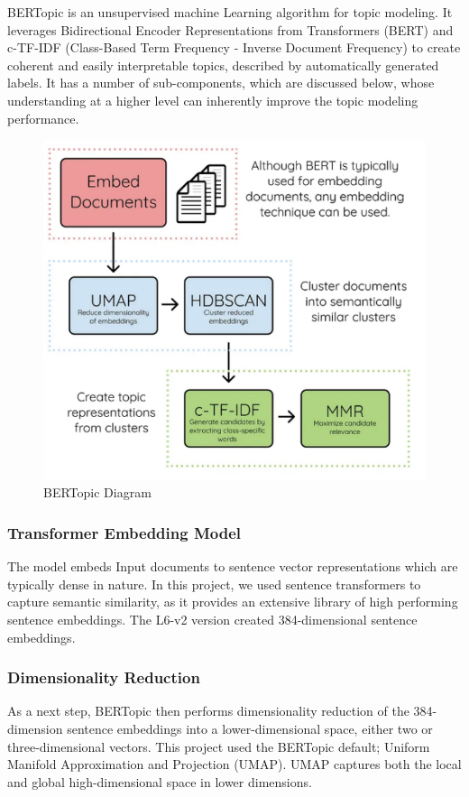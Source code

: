 \documentclass{article}
\theoremstyle{mytheoremstyle}
\theoremstyle{mytheoremstyle}
\theoremstyle{myproblemstyle}
\begin{document}
    BERTopic is an unsupervised machine Learning  algorithm for topic modeling. It leverages Bidirectional Encoder Representations from Transformers (BERT) and c-TF-IDF (Class-Based Term Frequency - Inverse Document Frequency) to create coherent and easily interpretable topics, described by automatically generated labels. It has a number of sub-components, which are discussed below, whose understanding at a higher level can inherently improve the topic modeling performance. \cite{grootendorst2022bertopic}
    
    \begin{figure}[ht]
        \centering
        \includegraphics[width=0.5\linewidth]{../images/BERTopic_diagram.png}
        \caption{BERTopic Diagram}
        \label{fig:bertopic_diagram}
    \end{figure}

    \subsubsection{Transformer Embedding Model}
    The model embeds Input documents to sentence vector representations which are typically dense in nature. In this project, we used sentence transformers to capture semantic similarity, as it provides an extensive library of high performing sentence embeddings. The L6-v2 version created 384-dimensional sentence embeddings.

    \subsubsection{Dimensionality Reduction}
    As a next step, BERTopic then performs dimensionality reduction of the 384-dimension sentence embeddings into a lower-dimensional space, either two or three-dimensional vectors. This project used the BERTopic default; Uniform Manifold Approximation and Projection (UMAP). UMAP captures both the local and global high-dimensional space in lower dimensions.
\end{document}
